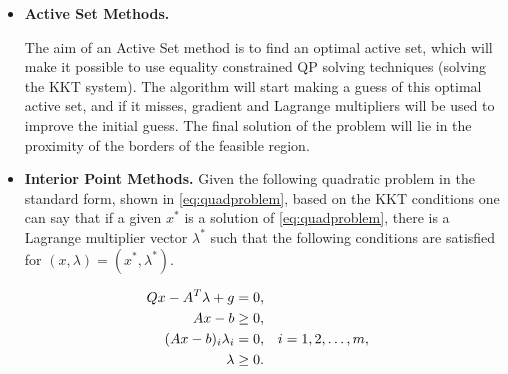 \begin{itemize}

\item \textbf{Active Set Methods.} 

 


The aim of an Active Set method is to find an optimal active set, which will make it possible to use equality constrained QP solving techniques (solving the KKT system). The algorithm will start making a guess of this optimal active set, and if it misses, gradient and Lagrange multipliers will be used to improve the initial guess. The final solution of the problem will lie in the proximity of the borders of the  feasible region.

\item \textbf{Interior Point Methods.} Given the following quadratic problem in the standard form, shown in \ref{eq:quadproblem}, based on the KKT conditions one can say that if a given $x^*$ is a solution of \ref{eq:quadproblem}, there is a Lagrange multiplier vector $\lambda^*$ such that the following conditions are satisfied for $(x, \lambda) = (x^*, \lambda^*)$.

\begin{equation} \label{eq:KKTIP}
 \begin{subequations}
 \begin{aligned}
  Qx - A^{T}\lambda + g &= 0, \\
  Ax - b &\geq 0, \\ 
  (Ax - b)_{i}\lambda_{i} &= 0, && i = 1, 2, \ldots , m, \\
  \lambda &\geq 0. 
 \end{aligned}
 \end{subequations}
\end{equation}


\end{itemize}
